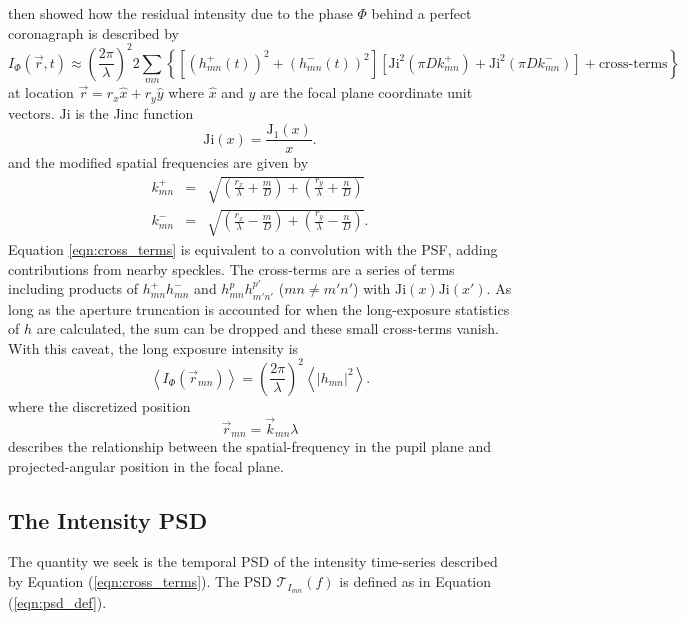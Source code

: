 \documentclass[10pt,preprint]{aastex631}
\newcommand{\Ji}{\mathrm{Ji}}
\newcommand{\jrmadd}[1]{\textcolor{blue}{#1}}
\begin{document}
\citet{2018JATIS...4a9001M} then showed how the residual intensity due to the phase $\Phi$ behind a perfect coronagraph is described by
\begin{equation}
I_\Phi(\vec{r},t) \approx \left(\frac{2\pi}{\lambda}\right)^2 2 \sum_{mn} \left\{  \left[ (h_{mn}^{+}(t))^2 + (h_{mn}^{-}(t))^2 \right] \left[ \Ji^2(\pi D k_{mn}^+) +\Ji^2(\pi D k_{mn}^-)\right] + \mbox{cross-terms} \right\}
\label{eqn:cross_terms}
\end{equation}
at location $\vec{r} = r_x \hat{x} + r_y\hat{y}$ where  $\hat{x}$ and  $\hat{y}$ are the focal plane coordinate unit vectors. $\Ji$ is the Jinc function
\begin{equation}
\Ji(x) = \frac{\mathrm{J}_1(x)}{x}.
\end{equation}
and the modified spatial frequencies are given by
\begin{eqnarray}
k_{mn}^+ &=& \sqrt{\left(\frac{r_x}{\lambda} + \frac{m}{D}\right) + \left(\frac{r_y}{\lambda} + \frac{n}{D}\right)} \\ 
k_{mn}^- &=& \sqrt{\left(\frac{r_x}{\lambda} - \frac{m}{D}\right) + \left(\frac{r_y}{\lambda} - \frac{n}{D}\right)}. \nonumber
\end{eqnarray}
Equation \ref{eqn:cross_terms} is equivalent to a convolution with the PSF, adding contributions from nearby speckles.  The cross-terms are a series of terms including products of $h_{mn}^+h_{mn}^-$ and $h_{mn}^ph_{m'n'}^{p'}$ ($mn \neq m'n'$) with $\Ji(x)\Ji(x')$.  As long as the aperture truncation is accounted for when the long-exposure statistics of $h$ are calculated, the sum can be dropped and these small cross-terms vanish.  With this caveat, the long exposure intensity is 
\begin{equation}
\left< I_\Phi(\vec{r}_{mn}) \right> =  \left(\frac{2\pi}{\lambda}\right)^2\left< |h_{mn}|^2 \right> .
\label{eqn:contrast_h2}
\end{equation}
where the discretized position 
\begin{equation}
\vec{r}_{mn} = \vec{k}_{mn} \lambda
\end{equation}
describes the relationship between the spatial-frequency in the pupil plane and projected-angular position in the focal plane.

\subsection{The Intensity PSD}

The quantity we seek is the temporal PSD of the intensity time-series described by Equation (\ref{eqn:cross_terms}).  The PSD $\mathcal{T}_{I_{mn}}(f)$ is defined as in Equation (\ref{eqn:psd_def}).
\end{document}
